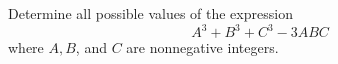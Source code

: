 Determine all possible values of the expression \[ A^3+B^3+C^3-3ABC \] where $A, B$, and $C$ are nonnegative integers.
